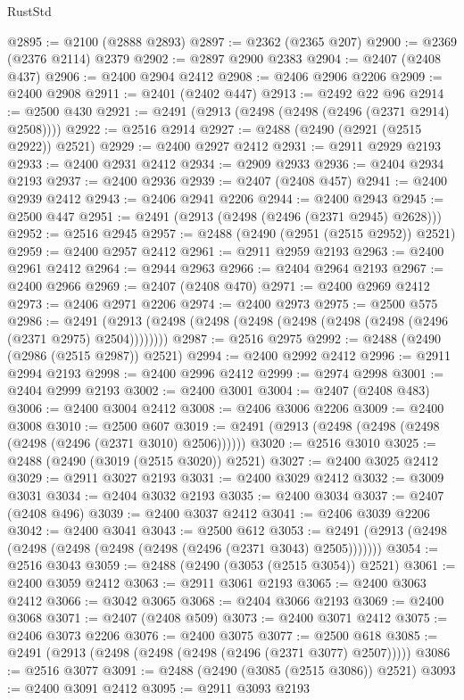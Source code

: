 \begin{lexlean}{RustStd}
\begin{coremodule}
@2895 := @2100 (@2888 @2893)
@2897 := @2362 (@2365 @207)
@2900 := @2369 (@2376 @2114) @2379
@2902 := @2897 @2900 @2383
@2904 := @2407 (@2408 @437)
@2906 := @2400 @2904 @2412
@2908 := @2406 @2906 @2206
@2909 := @2400 @2908
@2911 := @2401 (@2402 @447)
@2913 := @2492 @22 @96
@2914 := @2500 @430
@2921 := @2491 (@2913 (@2498 (@2498 (@2496 (@2371 @2914) @2508))))
@2922 := @2516 @2914
@2927 := @2488 (@2490 (@2921 (@2515 @2922)) @2521)
@2929 := @2400 @2927 @2412
@2931 := @2911 @2929 @2193
@2933 := @2400 @2931 @2412
@2934 := @2909 @2933
@2936 := @2404 @2934 @2193
@2937 := @2400 @2936
@2939 := @2407 (@2408 @457)
@2941 := @2400 @2939 @2412
@2943 := @2406 @2941 @2206
@2944 := @2400 @2943
@2945 := @2500 @447
@2951 := @2491 (@2913 (@2498 (@2496 (@2371 @2945) @2628)))
@2952 := @2516 @2945
@2957 := @2488 (@2490 (@2951 (@2515 @2952)) @2521)
@2959 := @2400 @2957 @2412
@2961 := @2911 @2959 @2193
@2963 := @2400 @2961 @2412
@2964 := @2944 @2963
@2966 := @2404 @2964 @2193
@2967 := @2400 @2966
@2969 := @2407 (@2408 @470)
@2971 := @2400 @2969 @2412
@2973 := @2406 @2971 @2206
@2974 := @2400 @2973
@2975 := @2500 @575
@2986 := @2491 (@2913 (@2498 (@2498 (@2498 (@2498 (@2498 (@2498 (@2496 (@2371 @2975) @2504))))))))
@2987 := @2516 @2975
@2992 := @2488 (@2490 (@2986 (@2515 @2987)) @2521)
@2994 := @2400 @2992 @2412
@2996 := @2911 @2994 @2193
@2998 := @2400 @2996 @2412
@2999 := @2974 @2998
@3001 := @2404 @2999 @2193
@3002 := @2400 @3001
@3004 := @2407 (@2408 @483)
@3006 := @2400 @3004 @2412
@3008 := @2406 @3006 @2206
@3009 := @2400 @3008
@3010 := @2500 @607
@3019 := @2491 (@2913 (@2498 (@2498 (@2498 (@2498 (@2496 (@2371 @3010) @2506))))))
@3020 := @2516 @3010
@3025 := @2488 (@2490 (@3019 (@2515 @3020)) @2521)
@3027 := @2400 @3025 @2412
@3029 := @2911 @3027 @2193
@3031 := @2400 @3029 @2412
@3032 := @3009 @3031
@3034 := @2404 @3032 @2193
@3035 := @2400 @3034
@3037 := @2407 (@2408 @496)
@3039 := @2400 @3037 @2412
@3041 := @2406 @3039 @2206
@3042 := @2400 @3041
@3043 := @2500 @612
@3053 := @2491 (@2913 (@2498 (@2498 (@2498 (@2498 (@2498 (@2496 (@2371 @3043) @2505)))))))
@3054 := @2516 @3043
@3059 := @2488 (@2490 (@3053 (@2515 @3054)) @2521)
@3061 := @2400 @3059 @2412
@3063 := @2911 @3061 @2193
@3065 := @2400 @3063 @2412
@3066 := @3042 @3065
@3068 := @2404 @3066 @2193
@3069 := @2400 @3068
@3071 := @2407 (@2408 @509)
@3073 := @2400 @3071 @2412
@3075 := @2406 @3073 @2206
@3076 := @2400 @3075
@3077 := @2500 @618
@3085 := @2491 (@2913 (@2498 (@2498 (@2498 (@2496 (@2371 @3077) @2507)))))
@3086 := @2516 @3077
@3091 := @2488 (@2490 (@3085 (@2515 @3086)) @2521)
@3093 := @2400 @3091 @2412
@3095 := @2911 @3093 @2193

\end{coremodule}
\end{lexlean}

